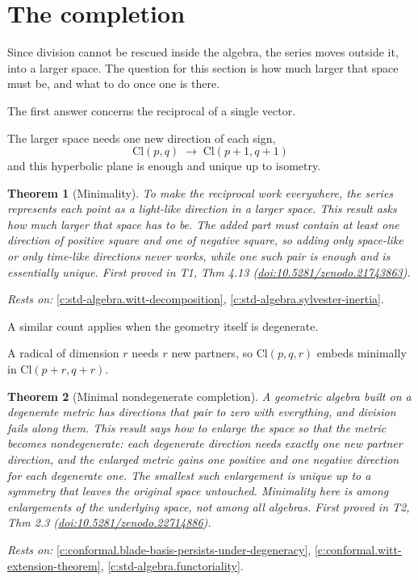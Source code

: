 \documentclass[11pt]{article}
\newtheorem{theorem}{Theorem}[section]
\theoremstyle{definition}
\theoremstyle{plain}
\providecommand{\Cl}{}\renewcommand{\Cl}{\mathrm{Cl}}
\begin{document}
\section{The completion}

Since division cannot be rescued inside the algebra, the series moves outside it, into a larger space. The question for this section is how much larger that space must be, and what to do once one is there.

The first answer concerns the reciprocal of a single vector.

The larger space needs one new direction of each sign, \[ \Cl(p,q) \;\longrightarrow\; \Cl(p{+}1, q{+}1) \] and this hyperbolic plane is enough and unique up to isometry.

\begin{theorem}[Minimality]\label{c:transport.minimality}
To make the reciprocal work everywhere, the series represents each point as a light-like direction in a larger space. This result asks how much larger that space has to be. The added part must contain at least one direction of positive square and one of negative square, so adding only space-like or only time-like directions never works, while one such pair is enough and is essentially unique.
\emph{First proved in} T1, Thm 4.13 (\href{https://doi.org/10.5281/zenodo.21743863}{doi:10.5281/zenodo.21743863}).
\end{theorem}
\noindent\emph{Rests on:} \ref{c:std-algebra.witt-decomposition}, \ref{c:std-algebra.sylvester-inertia}.

A similar count applies when the geometry itself is degenerate.

A radical of dimension $r$ needs $r$ new partners, so $\Cl(p,q,r)$ embeds minimally in $\Cl(p{+}r, q{+}r)$.

\begin{theorem}[Minimal nondegenerate completion]\label{c:conformal.minimal-nondegenerate-completion}
A geometric algebra built on a degenerate metric has directions that pair to zero with everything, and division fails along them. This result says how to enlarge the space so that the metric becomes nondegenerate: each degenerate direction needs exactly one new partner direction, and the enlarged metric gains one positive and one negative direction for each degenerate one. The smallest such enlargement is unique up to a symmetry that leaves the original space untouched. Minimality here is among enlargements of the underlying space, not among all algebras.
\emph{First proved in} T2, Thm 2.3 (\href{https://doi.org/10.5281/zenodo.22714886}{doi:10.5281/zenodo.22714886}).
\end{theorem}
\noindent\emph{Rests on:} \ref{c:conformal.blade-basis-persists-under-degeneracy}, \ref{c:conformal.witt-extension-theorem}, \ref{c:std-algebra.functoriality}.
\end{document}
